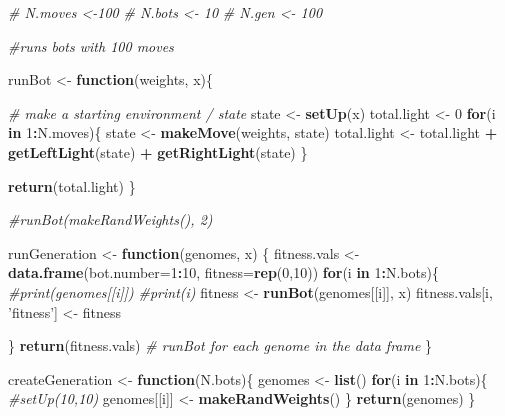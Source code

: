 \documentclass[]{article}
\newenvironment{Shaded}{\begin{snugshade}}{\end{snugshade}}
\newcommand{\CommentTok}[1]{\textcolor[rgb]{0.56,0.35,0.01}{\textit{#1}}}
\newcommand{\ControlFlowTok}[1]{\textcolor[rgb]{0.13,0.29,0.53}{\textbf{#1}}}
\newcommand{\DataTypeTok}[1]{\textcolor[rgb]{0.13,0.29,0.53}{#1}}
\newcommand{\DecValTok}[1]{\textcolor[rgb]{0.00,0.00,0.81}{#1}}
\newcommand{\KeywordTok}[1]{\textcolor[rgb]{0.13,0.29,0.53}{\textbf{#1}}}
\newcommand{\NormalTok}[1]{#1}
\newcommand{\OperatorTok}[1]{\textcolor[rgb]{0.81,0.36,0.00}{\textbf{#1}}}
\newcommand{\StringTok}[1]{\textcolor[rgb]{0.31,0.60,0.02}{#1}}
\begin{document}
\begin{Shaded}
\begin{Highlighting}[]
\CommentTok{# N.moves <-100}
\CommentTok{# N.bots <- 10}
\CommentTok{# N.gen <- 100}

\CommentTok{#runs bots with 100 moves}

\NormalTok{runBot <-}\StringTok{ }\ControlFlowTok{function}\NormalTok{(weights, x)\{}

  \CommentTok{# make a starting environment / state}
\NormalTok{  state <-}\StringTok{ }\KeywordTok{setUp}\NormalTok{(x)}
\NormalTok{  total.light <-}\StringTok{ }\DecValTok{0}
  \ControlFlowTok{for}\NormalTok{(i }\ControlFlowTok{in} \DecValTok{1}\OperatorTok{:}\NormalTok{N.moves)\{}
\NormalTok{    state <-}\StringTok{ }\KeywordTok{makeMove}\NormalTok{(weights, state)}
\NormalTok{    total.light <-}\StringTok{ }\NormalTok{total.light }\OperatorTok{+}\StringTok{ }\KeywordTok{getLeftLight}\NormalTok{(state) }\OperatorTok{+}\StringTok{ }\KeywordTok{getRightLight}\NormalTok{(state)}
\NormalTok{  \}}
  
  \KeywordTok{return}\NormalTok{(total.light)}
\NormalTok{\}}

\CommentTok{#runBot(makeRandWeights(), 2)}
  
\NormalTok{runGeneration <-}\StringTok{ }\ControlFlowTok{function}\NormalTok{(genomes, x) \{}
\NormalTok{  fitness.vals <-}\StringTok{ }\KeywordTok{data.frame}\NormalTok{(}\DataTypeTok{bot.number=}\DecValTok{1}\OperatorTok{:}\DecValTok{10}\NormalTok{, }\DataTypeTok{fitness=}\KeywordTok{rep}\NormalTok{(}\DecValTok{0}\NormalTok{,}\DecValTok{10}\NormalTok{))}
  \ControlFlowTok{for}\NormalTok{(i }\ControlFlowTok{in} \DecValTok{1}\OperatorTok{:}\NormalTok{N.bots)\{}
   \CommentTok{#print(genomes[[i]])}
    \CommentTok{#print(i)}
\NormalTok{    fitness <-}\StringTok{ }\KeywordTok{runBot}\NormalTok{(genomes[[i]], x)}
\NormalTok{    fitness.vals[i, }\StringTok{'fitness'}\NormalTok{] <-}\StringTok{ }\NormalTok{fitness}
   
\NormalTok{    \}}
  \KeywordTok{return}\NormalTok{(fitness.vals)}
  \CommentTok{# runBot for each genome in the data frame}
\NormalTok{\}}


\NormalTok{createGeneration <-}\StringTok{ }\ControlFlowTok{function}\NormalTok{(N.bots)\{}
\NormalTok{  genomes <-}\StringTok{ }\KeywordTok{list}\NormalTok{()}
  \ControlFlowTok{for}\NormalTok{(i }\ControlFlowTok{in} \DecValTok{1}\OperatorTok{:}\NormalTok{N.bots)\{}
    \CommentTok{#setUp(10,10)}
\NormalTok{    genomes[[i]] <-}\StringTok{ }\KeywordTok{makeRandWeights}\NormalTok{()    }
\NormalTok{  \}}
  \KeywordTok{return}\NormalTok{(genomes)}
\NormalTok{\}}


\end{Highlighting}
\end{Shaded}
\end{document}

